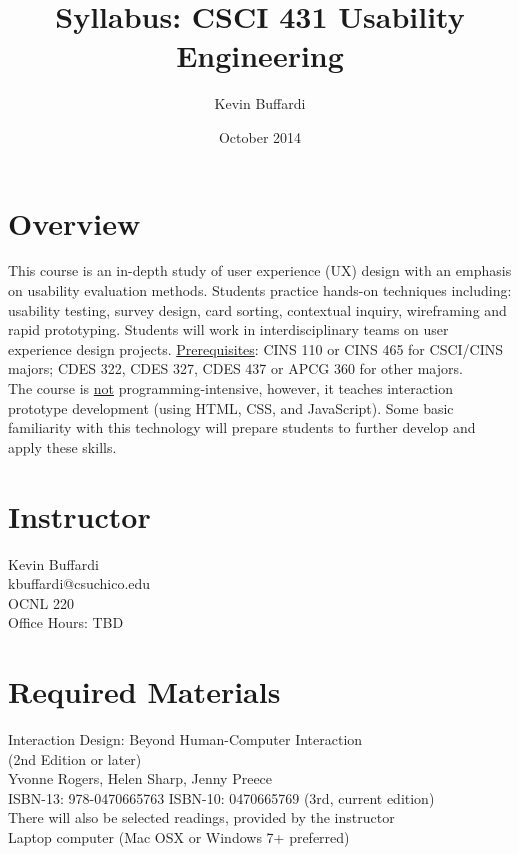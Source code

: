 \documentclass[12pt]{article}
\title{Syllabus: CSCI 431 Usability Engineering}
\author{Kevin Buffardi}
\date{October 2014}
\begin{document}
  \maketitle
  \section*{Overview}	 
  \noindent
  This course is an in-depth study of user experience (UX) design with an emphasis on usability evaluation methods. Students practice hands-on techniques including: usability testing, survey design, card sorting, contextual inquiry, wireframing and rapid prototyping. Students will work in interdisciplinary teams on user experience design projects.
  \newline
  \newline
  \underline{Prerequisites}: CINS 110 or CINS 465 for CSCI/CINS majors; CDES 322, CDES 327, CDES 437 or APCG 360 for other majors. \\
  \newline
  The course is \underline{not} programming-intensive, however, it teaches interaction prototype development (using HTML, CSS, and JavaScript). Some basic familiarity with this technology will prepare students to further develop and apply these skills. 
  
  \section*{Instructor}
  \noindent
  Kevin Buffardi \\
  kbuffardi@csuchico.edu \\
  OCNL 220 \\
  Office Hours: TBD\\

  \section*{Required Materials}
  \noindent
  Interaction Design: Beyond Human-Computer Interaction \\
  (2nd Edition or later) \\
  Yvonne Rogers, Helen Sharp, Jenny Preece \\
  ISBN-13: 978-0470665763  ISBN-10: 0470665769 (3rd, current edition) \\
  \newline
  There will also be selected readings, provided by the instructor \\
  \newline
  Laptop computer (Mac OSX or Windows 7+ preferred)
\end{document}
